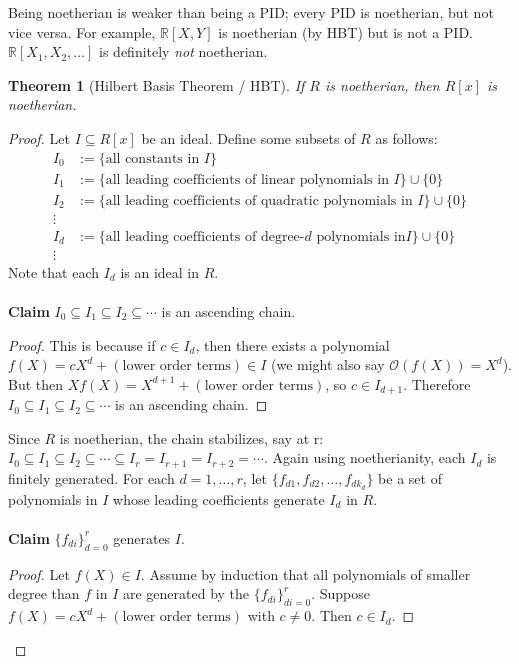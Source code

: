 \documentclass[12pt]{article}
\newcommand{\real}{\mathbb{R}}
\newcommand{\ita}[1]{\textit{#1}}
\newtheorem{theorem}{Theorem}[section]
\theoremstyle{definition}
\begin{document}
Being noetherian is weaker than being a PID; every PID is noetherian, but not vice versa. For example, $\real[X,Y]$ is noetherian (by HBT) but is not a PID. $\real[X_1,X_2,\dotsc]$ is definitely \ita{not} noetherian.
\begin{theorem}[Hilbert Basis Theorem / HBT]
    If $R$ is noetherian, then $R[x]$ is noetherian.
\end{theorem}
\begin{proof}
    Let $I\subseteq R[x]$ be an ideal. Define some subsets of $R$ as follows:
    \begin{equation*}
        \begin{split}
            I_0&:=\{\text{all constants in }I\}\\
            I_1&:=\{\text{all leading coefficients of linear polynomials in }I\}\cup\{0\}\\
            I_2&:=\{\text{all leading coefficients of quadratic polynomials in }I\}\cup\{0\}\\
            \vdots&\\
            I_d&:=\{\text{all leading coefficients of degree-$d$ polynomials in}I\}\cup\{0\}\\
            \vdots&
        \end{split}
    \end{equation*}
    Note that each $I_d$ is an ideal in $R$. \\\\
    \textbf{Claim} $I_0\subseteq I_1\subseteq I_2\subseteq\dotsb$ is an ascending chain.
    \begin{proof}
        This is because if $c\in I_d$, then there exists a polynomial $f(X)=cX^d+(\text{lower order terms})\in I$ (we might also say $\mathcal{O}(f(X))=X^d$). But then $Xf(X)=X^{d+1}+(\text{lower order terms})$, so $c\in I_{d+1}$. Therefore $I_0\subseteq I_1\subseteq I_2\subseteq\dotsb$ is an ascending chain.
    \end{proof}
    Since $R$ is noetherian, the chain stabilizes, say at r: $I_0\subseteq I_1\subseteq I_2\subseteq\dotsb\subseteq I_r=I_{r+1}=I_{r+2}=\dotsb$. Again using noetherianity, each $I_d$ is finitely generated. For each $d=1,\dotsc,r$, let $\{f_{d1},f_{d2},\dotsc,f_{dk_d}\}$ be a set of polynomials in $I$ whose leading coefficients generate $I_d$ in $R$.\\\\
    \textbf{Claim} $\{f_{di}\}_{d=0}^r$ generates $I$.
    \begin{proof}
        Let $f(X)\in I$. Assume by induction that all polynomials of smaller degree than $f$ in $I$ are generated by the $\{f_{di}\}_{di=0}^r$. Suppose $f(X)=cX^d+(\text{lower order terms})$ with $c\neq0$. Then $c\in I_d$.

\end{proof}
\end{proof}
\end{document}
